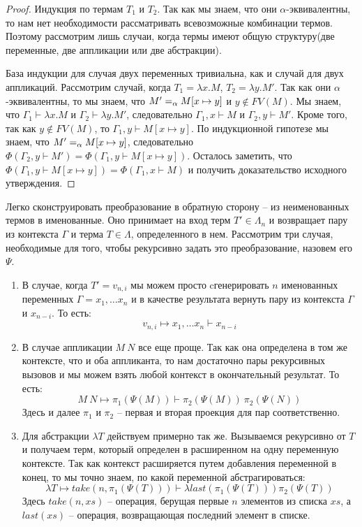 \begin{proof}
  Индукция по термам $T_{1}$ и $T_{2}$. Так как мы знаем, что они $\alpha$-эквивалентны, то нам нет необходимости рассматривать всевозможные комбинации термов. Поэтому рассмотрим лишь случаи, когда термы имеют общую структуру(две переменные, две аппликации или две абстракции).

  База индукции для случая двух переменных тривиальна, как и случай для двух аппликаций. Рассмотрим случай, когда $T_{1} = \lambda x.M$, $T_{2} = \lambda y.M'$. Так как они $\alpha$-эквивалентны, то мы знаем, что $M' =_{\alpha} M[x \mapsto y]$ и $y \notin FV(M)$. Мы знаем, что $\Gamma_{1} \vdash \lambda x.M$ и $\Gamma_{2} \vdash \lambda y.M'$, следовательно $\Gamma_{1}, x \vdash M$ и $\Gamma_{2}, y \vdash M'$. Кроме того, так как $y \notin FV(M)$, то $\Gamma_{1}, y \vdash M[x \mapsto y]$. По индукционной гипотезе мы знаем, что $M' =_{\alpha} M[x \mapsto y]$, следовательно $\Phi(\Gamma_{2}, y \vdash M') = \Phi(\Gamma_{1}, y \vdash M[x \mapsto y])$. Осталось заметить, что $\Phi(\Gamma_{1}, y \vdash M[x \mapsto y]) = \Phi(\Gamma_{1}, x \vdash M)$ и получить доказательство исходного утверждения.
\end{proof}

Легко сконструировать преобразование в обратную сторону -- из неименованных термов в именованные. Оно принимает на вход терм $T' \in \Lambda_{n}$ и возвращает пару из контекста $\Gamma$ и терма $T \in \Lambda$, определенного в нем. Рассмотрим три случая, необходимые для того, чтобы рекурсивно задать это преобразование, назовем его $\Psi$.

\begin{enumerate}
  \item В случае, когда $T' = v_{n, i}$ мы можем просто cгенерировать $n$ именованных переменных $\Gamma = x_{1}, \dots x_{n}$ и в качестве результата вернуть пару из контекста $\Gamma$ и $x_{n - i}$. То есть:
  $$ v_{n, i} \mapsto x_{1}, \dots x_{n} \vdash x_{n-i} $$

  \item В случае аппликации $M\ N$ все еще проще. Так как она определена в том же контексте, что и оба аппликанта, то нам достаточно пары рекурсивных вызовов и мы можем взять любой контекст в окончательный результат. То есть:
  $$ M\ N \mapsto \pi_{1}(\Psi(M)) \vdash \pi_{2}(\Psi(M))\ \pi_{2}(\Psi(N))$$
  Здесь и далее $\pi_{1}$ и $\pi_{2}$ -- первая и вторая проекция для пар соответственно.

  \item Для абстракции $\lambda T$ действуем примерно так же. Вызываемся рекурсивно от $T$ и получаем терм, который определен в расширенном на одну переменную контексте. Так как контекст расширяется путем добавления переменной в конец, то мы точно знаем, по какой переменной абстрагироваться:
  $$ \lambda T \mapsto take(n, \pi_{1}(\Psi(T))) \vdash \lambda last(\pi_{1}(\Psi(T))) \pi_{2}(\Psi(T)) $$
  Здесь $take(n, xs)$ -- операция, берущая первые $n$ элементов из списка $xs$, а $last(xs)$ -- операция, возвращающая последний элемент в списке.
\end{enumerate}

